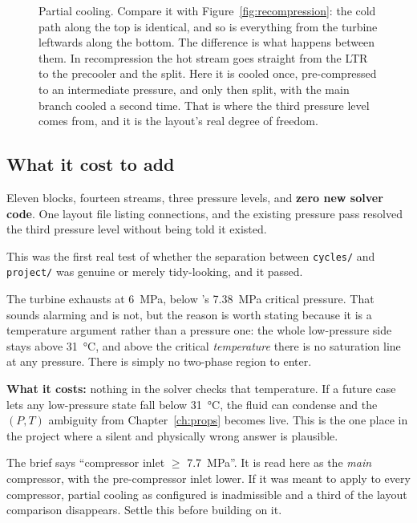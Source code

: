 \documentclass[11pt,a4paper]{report}
\newcommand{\code}[1]{\texttt{\small #1}}
\begin{document}
\begin{figure}[htbp]
\centering

\caption{Partial cooling. Compare it with Figure~\ref{fig:recompression}: the
cold path along the top is identical, and so is everything from the turbine
leftwards along the bottom. The difference is what happens between them. In
recompression the hot stream goes straight from the LTR to the precooler and
the split. Here it is cooled once, pre-compressed to an intermediate
pressure, and only then split, with the main branch cooled a second time.
That is where the third pressure level comes from, and it is the layout's
real degree of freedom.}
\label{fig:partialcooling}
\end{figure}

\subsection{What it cost to add}

Eleven blocks, fourteen streams, three pressure levels, and \textbf{zero new
solver code}. One layout file listing connections, and the existing pressure
pass resolved the third pressure level without being told it existed.

This was the first real test of whether the separation between
\code{cycles/} and \code{project/} was genuine or merely tidy-looking, and
it passed.

\begin{caveat}[title={Caveat: the low-pressure side runs below the critical pressure}]
The turbine exhausts at \SI{6}{\mega\pascal}, below 's
\SI{7.38}{\mega\pascal} critical pressure. That sounds alarming and is not,
but the reason is worth stating because it is a temperature argument rather
than a pressure one: the whole low-pressure side stays above
\SI{31}{\celsius}, and above the critical \emph{temperature} there is no
saturation line at any pressure. There is simply no two-phase region to
enter.

\textbf{What it costs:} nothing in the solver checks that temperature. If a
future case lets any low-pressure state fall below \SI{31}{\celsius}, the
fluid can condense and the $(P,T)$ ambiguity from Chapter~\ref{ch:props}
becomes live. This is the one place in the project where a silent and
physically wrong answer is plausible.
\end{caveat}

\begin{caveat}[title={Caveat: whose compressor does the brief constrain?}]
The brief says ``compressor inlet $\ge$ \SI{7.7}{\mega\pascal}''. It is read
here as the \emph{main} compressor, with the pre-compressor inlet lower. If
it was meant to apply to every compressor, partial cooling as configured is
inadmissible and a third of the layout comparison disappears. Settle this
before building on it.
\end{caveat}
\end{document}
